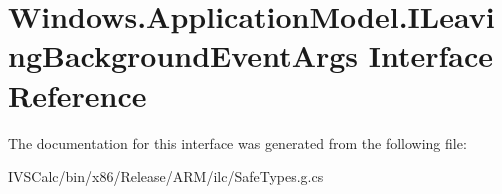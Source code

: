 \hypertarget{interface_windows_1_1_application_model_1_1_i_leaving_background_event_args}{}\section{Windows.\+Application\+Model.\+I\+Leaving\+Background\+Event\+Args Interface Reference}
\label{interface_windows_1_1_application_model_1_1_i_leaving_background_event_args}


The documentation for this interface was generated from the following file\+:\begin{DoxyCompactItemize}
\item 
I\+V\+S\+Calc/bin/x86/\+Release/\+A\+R\+M/ilc/Safe\+Types.\+g.\+cs\end{DoxyCompactItemize}
